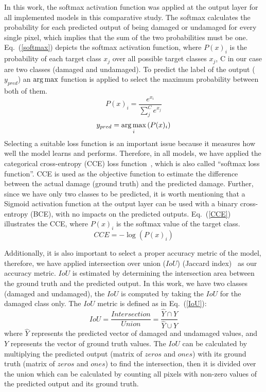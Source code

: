 In this work, the softmax activation function was applied at the output layer for all implemented models in this comparative study.
The softmax calculates the probability for each predicted output of being damaged or undamaged for every single pixel, which implies that the sum of the two probabilities must be one. 
Eq.~(\ref{softmax}) depicts the softmax activation function, where \(P(x)_{i}\) is the probability of each target class \(x_{j}\) over all possible target classes \(x_{j}\), C in our case are two classes  (damaged and undamaged).
To predict the label of the output (\(y_{pred}\)) an \(\operatorname*{arg\,max}\) function is applied to select the maximum probability between both of them.
\begin{equation}
	P(x)_{i} = \frac{e^{x_{i}}}{\sum_{j}^{C} e^{x_{j}}}
	\label{softmax}
\end{equation} 
\begin{equation}
	y_{pred} = \operatorname*{arg\,max}_{i}\left( P(x)_{i} \right)
	\label{argmax}
\end{equation}
Selecting a suitable loss function is an important issue because it measures how well the model learns and performs.
Therefore, in all models, we have applied the categorical cross-entropy (CCE) loss function~\cite{Bonaccorso2020}, which is also called \enquote{softmax loss function}.
CCE is used as the objective function to estimate the difference between the actual damage (ground truth) and the predicted damage.
Further, since we have only two classes to be predicted, it is worth mentioning that a Sigmoid activation function at the output layer can be used with a binary cross-entropy (BCE), with no impacts on the predicted outputs.
Eq.~(\ref{CCE}) illustrates the CCE, where \( P(x)_{i}\) is the softmax value of the target class. 
\begin{equation}	
	CCE = -\log\left( P(x)_{i} \right)
	\label{CCE}
\end{equation}

Additionally, it is also important to select a proper accuracy metric of the model, therefore, we have applied intersection over union (\(IoU\)) (Jaccard index)~\cite{Bertels2019} as our accuracy metric. 
\(IoU\) is estimated by determining the intersection area between the ground truth and the predicted output.
In this work, we have two classes (damaged and undamaged), the \(IoU\) is computed by taking the \(IoU\) for the damaged class only.
The \(IoU\) metric is defined as in Eq.~(\ref{IoU}):
\begin{equation}
IoU = \frac{Intersection}{Union} = \frac{\hat{Y} \cap Y}{\hat{Y} \cup Y} 
\label{IoU}
\end{equation}
where \(\hat{Y}\) represents the predicted vector of damaged and undamaged values, and \(Y\) represents the vector of ground truth values.
The \(IoU\) can be calculated by multiplying the predicted output (matrix of \(zeros\) and \(ones\)) with its ground truth (matrix of \(zeros\) and \(ones\)) to find the intersection, then it is divided over the union which can be calculated by counting all pixels with non-zero values of the predicted output and its ground truth.

